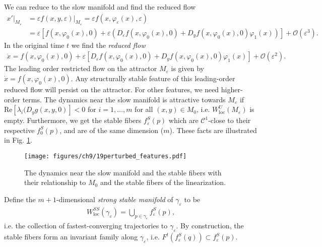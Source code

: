 We can reduce to the slow manifold and find the reduced flow
\begin{align}
	\left. x' \right|_{M_{\varepsilon}} &= \varepsilon\left. f(x,y, \varepsilon)\right|_{M_{\varepsilon }}	= \varepsilon f(x, \varphi_\varepsilon(x), \varepsilon) \\
					    &= \varepsilon \left[ f(x, \varphi_0 (x) , 0) + \varepsilon\left( D_{\varepsilon} f(x, \varphi_0(x), 0) + D_{y}f(x, \varphi_0 (x), 0) \varphi_1(x) \right) \right] + \mathcal{O}(\varepsilon ^{3}).
\end{align}
In the original time $t$ we find the \emph{reduced flow}
\begin{align}
	\boxed{
		\dot{x} = f(x, \varphi_0(x), 0) + \varepsilon \left[ D_{\varepsilon}f(x, \varphi_0(x), 0) + D_{y} f(x, \varphi_0(x), 0) \varphi_1(x) \right] + \mathcal{O}(\varepsilon^{2}).
	}
\end{align}
The leading order restricted flow on the attractor $M_{\varepsilon}$ is given by $\dot{x} = f(x, \varphi_0(x), 0)$. Any structurally stable feature of this leading-order reduced flow will persist on the attractor. For other features, we need higher-order terms. The dynamics near the slow manifold is attractive towards $M_{\varepsilon}$ if $ \textrm{Re} [\lambda_i ( D_{y}g(x,y,0)]<0$ for $i=1, \ldots, m$ for all $(x,y) \in M_0$, i.e. $W^{U}_{ \textrm{loc} }(M_{\varepsilon})$ is empty. Furthermore, we get the stable fibers $f_{\varepsilon}^{S}(p)$ which are $\mathcal{C}^{1}$-close to their respective $f_{0}^{S}(p)$, and are of the same dimension ($m$). These facts are illustrated in Fig. \ref{fig:perturbed_features}.

\begin{figure}[h!]
	\centering
	\texttt{[image: figures/ch9/19perturbed\_features.pdf]}
	\caption{The dynamics near the slow manifold and the stable fibers with their relationship to $M_0$ and the stable fibers of the linearization.}
	\label{fig:perturbed_features}
\end{figure}

Define the $m+1$-dimensional \emph{strong stable manifold} of $\gamma_{\varepsilon}$ to be
\begin{align}
	W_{ \textrm{loc} }^{SS}(\gamma_{\varepsilon}) = \bigcup_{p \in \gamma_{\varepsilon}}f_{\varepsilon}^{S}(p),
\end{align}
i.e. the collection of fastest-converging trajectories to $\gamma_\varepsilon$. By construction, the stable fibers form an invariant family along $\gamma_{\varepsilon}$, i.e. $F^{t}(f^{S}_{\varepsilon}(q)) \subset f^{S}_{\varepsilon}(p)$.

